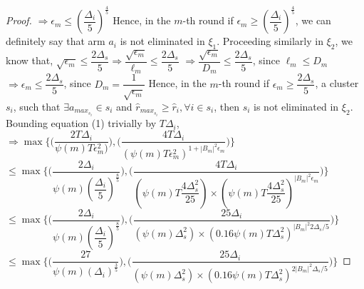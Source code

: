 \begin{proof}
\newline
\hspace*{5em}$\Rightarrow \epsilon_{m}\leq(\dfrac{\Delta_{i}}{5})^{\frac{4}{5}}$
\newline
Hence, in the $m$-th round if $\epsilon_{m}\geq(\dfrac{\Delta_{i}}{5})^{\frac{4}{5}}$, we can definitely say that arm $a_{i}$ is not eliminated in $\xi_{1}$.
\newline
Proceeding similarly in $\xi_{2}$, we know that,
\newline
$\sqrt{\epsilon_{m}}\leq\dfrac{2\Delta_{s}}{5}\Rightarrow \dfrac{\sqrt{\epsilon_{m}}}{\ell_{m}}\leq\dfrac{2\Delta_{s}}{5}$ 
\newline 
\hspace*{5em}$\Rightarrow \dfrac{\sqrt{\epsilon_{m}}}{D_{m}}\leq\dfrac{2\Delta_{s}}{5}$, since $\ell_{m}\leq D_{m}$
\newline
\hspace*{5em}$\Rightarrow \epsilon_{m}\leq\dfrac{2\Delta_{s}}{5}$, since $D_{m}=\dfrac{1}{\sqrt{\epsilon_{m}}}$
\newline
Hence, in the $m$-th round if $\epsilon_{m}\geq\dfrac{2\Delta_{s}}{5}$, a cluster $s_{i}$, such that $\exists a_{max_{s_{i}}}\in s_{i}$ and $\hat{r}_{max_{s_{i}}}\geq\hat{r}_{i},\forall i\in s_{i}$, then $s_{i}$ is not eliminated in $\xi_{2}$.
\newline
Bounding equation (1) trivially by  $T\Delta_{i}$,
\newline\newline
$\Rightarrow \max{\bigg\lbrace \bigg(\dfrac{2T\Delta_{i}}{\psi(m)T\epsilon_{m}^{2})}\bigg) ,\bigg(\dfrac{4T\Delta_{i}}{(\psi(m)T\epsilon_{m}^{2})^{1+|B_{m}|^{2}\epsilon_{m}}}\bigg)\bigg\rbrace}$
\newline
$\leq \max{\bigg\lbrace \bigg(\dfrac{2\Delta_{i}}{\psi(m)(\dfrac{\Delta_{i}}{5})^{\frac{8}{5}}}\bigg) ,\bigg(\dfrac{4T\Delta_{i}}{(\psi(m)T\dfrac{4\Delta_{s}^{2}}{25})\times(\psi(m)T\dfrac{4\Delta_{s}^{2}}{25})^{|B_{m}|^{2}\epsilon_{m}}}\bigg)\bigg\rbrace}$
\newline
$\leq \max{\bigg\lbrace \bigg(\dfrac{2\Delta_{i}}{\psi(m)(\dfrac{\Delta_{i}}{5})^{\frac{8}{5}}}\bigg) ,\bigg(\dfrac{25\Delta_{i}}{(\psi(m)\Delta_{s}^{2})\times(0.16\psi(m)T\Delta_{s}^{2})^{|B_{m}|^{2}2\Delta_{s}/5}}\bigg)\bigg\rbrace}$
\newline
$\leq \max{\bigg\lbrace \bigg(\dfrac{27}{\psi(m)(\Delta_{i})^{\frac{3}{5}}}\bigg) ,\bigg(\dfrac{25\Delta_{i}}{(\psi(m)\Delta_{s}^{2})\times(0.16\psi(m)T\Delta_{s}^{2})^{2|B_{m}|^{2}\Delta_{s}/5}}\bigg)\bigg\rbrace}$

\end{proof}

